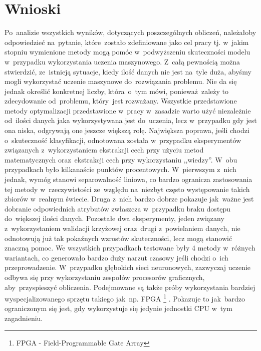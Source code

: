 
\section{Wnioski}\label{conclusion}
Po~analizie wszystkich wyników, dotyczących poszczególnych obliczeń, należałoby odpowiedzieć na~pytanie, które~zostało zdefiniowane jako cel pracy tj. w~jakim stopniu wymienione metody mogą pomóc w~podwyższeniu skuteczności modelu w~przypadku wykorzystania uczenia maszynowego. Z~całą pewnością można stwierdzić, ze~istnieją  sytuacje, kiedy ilość danych nie jest na~tyle duża, abyśmy mogli wykorzystać uczenie maszynowe do~rozwiązania problemu. Nie da się jednak określić konkretnej liczby, która~o~tym mówi, ponieważ~zależy to zdecydowanie od~problemu, który~jest rozważany. Wszystkie przedstawione metody optymalizacji przedstawione w~pracy w~zasadzie warto użyć niezależnie od~ilości danych jaka wykorzystywana jest do~uczenia, lecz w~przypadku gdy jest ona niska, odgrywają one jeszcze większą rolę. Największa poprawa, jeśli chodzi o~skuteczność klasyfikacji, odnotowana została w~przypadku eksperymentów związanych z~wykorzystaniem ekstrakcji cech przy użyciu metod matematycznych oraz~ekstrakcji cech przy wykorzystaniu ,,wiedzy''. W~obu przypadkach było kilkanaście punktów procentowych. W~pierwszym z~nich jednak, wymóg stanowi separowalność liniowa, co bardzo ogranicza zastosowania tej metody w~rzeczywistości ze~względu na~niezbyt często występowanie takich zbiorów w~realnym świecie. Druga z~nich bardzo dobrze pokazuje jak~ważne jest dobranie odpowiednich atrybutów zwłaszcza w~przypadku braku dostępu do~większej ilości danych. Pozostałe dwa eksperymenty, jeden związany z~wykorzystaniem walidacji krzyżowej oraz~drugi z~powielaniem danych, nie odnotowują już tak pokaźnych wzrostów skuteczności, lecz mogą stanowić znaczną pomoc. We wszystkich przypadkach testowane były 4 metody w~różnych wariantach, co generowało bardzo duży narzut czasowy jeśli chodzi o~ich przeprowadzenie. W~przypadku głębokich sieci neuronowych, zazwyczaj uczenie odbywa się przy wykorzystaniu zespołów procesorów graficznych, aby~przyspieszyć obliczenia. Podejmowane są także próby wykorzystania bardziej wyspecjalizowanego sprzętu takiego jak~np. FPGA \footnote{FPGA - Field-Programmable Gate Array} \cite{nurvitadhi2017can}. Pokazuje to jak~bardzo ograniczonym się jest, gdy wykorzystuje się jedynie jednostki CPU w~tym zagadnieniu.

